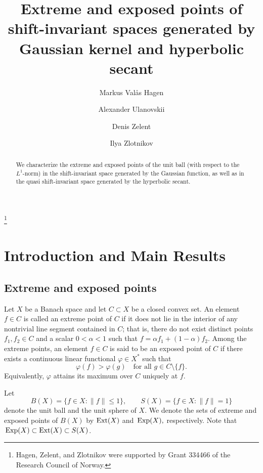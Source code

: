\documentclass[12pt]{amsart}
\title[On extreme points in shift-invariant spaces]{Extreme and exposed points of shift-invariant spaces generated by Gaussian kernel and hyperbolic secant}
\author[Hagen]{Markus Valås Hagen}
\author[Ulanovskii]{Alexander Ulanovskii}
\author[Zelent]{Denis Zelent}
\author[Zlotnikov]{Ilya Zlotnikov}
\numberwithin{equation}{section}
\theoremstyle{plain}
\theoremstyle{definition}
\newcommand{\ext}{{\rm Ext}}
\newcommand{\expo}{\,{\rm Exp}}
\begin{document}
\thanks{Hagen, Zelent, and Zlotnikov were supported by Grant 334466 of the Research Council of Norway.}

\begin{abstract}
We characterize the extreme and exposed points of the unit ball (with respect to the $L^1$-norm) in the shift-invariant space generated by the Gaussian function, as well as in the quasi shift-invariant space generated by the hyperbolic secant.
\end{abstract}

\maketitle


\section{Introduction and Main Results}

\subsection{Extreme and exposed points}


Let $X$ be a Banach space and let $C\subset X$ be a closed convex set. An element $f \in C$ is called an extreme point of $C$ if it does not lie in the interior of any nontrivial line segment contained in $C$; that is, there do not exist distinct points $f_1, f_2 \in C$ and a scalar $0 < \alpha < 1$ such that $f = \alpha f_1 + (1-\alpha) f_2$. Among the extreme points, an element $f \in C$ is said to be an exposed point of $C$ if there exists a continuous linear functional $\varphi \in X^\ast$ such that $$\varphi(f) > \varphi(g) \quad \text{for all } g \in C \setminus \{f\}.$$
Equivalently, $\varphi$ attains its  maximum over $C$ uniquely at $f$.

Let
$$B(X)= \{ f \in X : \|f\| \le 1 \}, \qquad S(X) = \{ f \in X : \|f\| = 1 \}$$ denote the unit ball and the unit sphere of $X$.
We denote the sets of extreme and exposed points of $B(X)$ by
$\ext(X)$ and  $\expo(X),$
respectively. Note that $\expo(X)\subset \ext(X)\subset S(X)$. 
\end{document}
